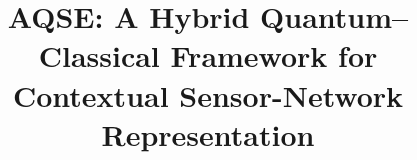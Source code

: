 \documentclass[10pt,journal]{IEEEtran}
\title{AQSE: A Hybrid Quantum--Classical Framework for Contextual Sensor-Network Representation}
\begin{document}
\maketitle
\begin{abstract}

\end{abstract}
\begin{IEEEkeywords}

\end{IEEEkeywords}














\end{document}
